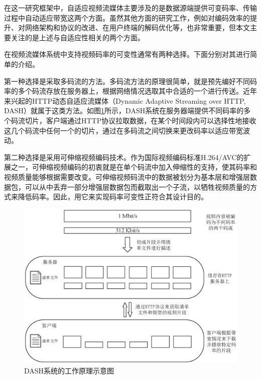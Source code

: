 \vspace{10pt}
在这一研究框架中，自适应视频流媒体主要涉及的是数据源端提供可变码率、传输过程中自动适应带宽这两个方面。虽然其他方面的研究工作，例如对编码效率的提升、对网络架构和协议的改进、在用户终端的解码优化等，也非常重要，但本文主要关注的是上述与自适应性相关的两个方面。

在视频流媒体系统中支持视频码率的可变性通常有两种选择。下面分别对其进行简单的介绍。

第一种选择是采取多码流的方法。多码流方法的原理很简单，就是预先编好不同码率的多个码流存放在服务器上，根据网络情况选取其中合适的一个进行传送。近年来兴起的HTTP动态自适应流媒体（Dynamic Adaptive Streaming over HTTP,  DASH）\supercite{Sodagar2011}就属于这类方法。如图\ref{fig:DASH}所示，DASH系统在服务器端提供不同码率的多个码流切片，客户端通过HTTP协议拉取数据，在某个时间段内可以选择性地接收这几个码流中任何一个的切片，通过在多码流之间切换来更改码率以适应带宽波动。

第二种选择是采用可伸缩视频编码\supercite{SVC-Overview}技术。作为国际视频编码标准H.264/AVC\supercite{H.264}的扩展之一，可伸缩视频编码的初衷就是在单个码流中加入伸缩性的支持，使其码率和视频质量能够根据需要改变。可伸缩视频码流中的数据被划分为基本层和增强层数据包，可以从中丢弃一部分增强层数据包而截取出一个子流，以牺牲视频质量的方式来降低码率。因此，用它来实现码率可变性正符合其设计目的。

\begin{figure}[t]
	\centering
	\vspace{10pt}
	\includegraphics[width = 1.0\linewidth]{eps/DASH}
	\caption{DASH系统的工作原理示意图\label{fig:DASH}}
\end{figure}

